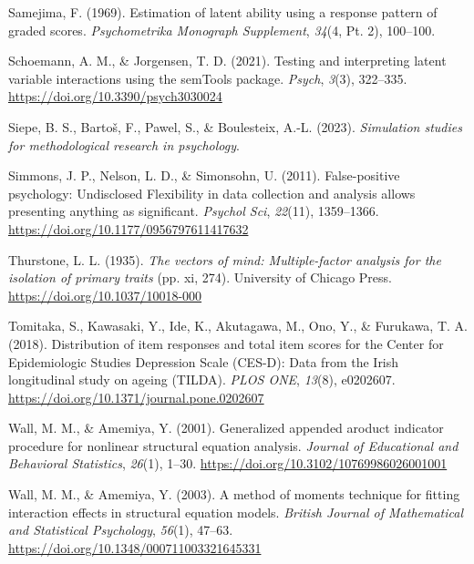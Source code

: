\documentclass[
  11pt,
  man]{apa6}
\newlength{\cslhangindent}
\newlength{\cslentryspacingunit} %
\newenvironment{CSLReferences}[2] %
 {%
  \setlength{\parindent}{0pt}
  \ifodd #1
  \let\oldpar\par
  \def\par{\hangindent=\cslhangindent\oldpar}
  \fi
  \setlength{\parskip}{#2\cslentryspacingunit}
 }%
 {}
\begin{document}
\begin{CSLReferences}{1}{0}
\leavevmode{}%
Samejima, F. (1969). Estimation of latent ability using a response pattern of graded scores. \emph{Psychometrika Monograph Supplement}, \emph{34}(4, Pt. 2), 100--100.

\leavevmode{}%
Schoemann, A. M., \& Jorgensen, T. D. (2021). Testing and interpreting latent variable interactions using the {semTools} package. \emph{Psych}, \emph{3}(3), 322--335. \url{https://doi.org/10.3390/psych3030024}

\leavevmode{}%
Siepe, B. S., Bartoš, F., Pawel, S., \& Boulesteix, A.-L. (2023). \emph{Simulation {studies} for {methodological research} in {psychology}}.

\leavevmode{}%
Simmons, J. P., Nelson, L. D., \& Simonsohn, U. (2011). False-{positive psychology}: {Undisclosed Flexibility} in {data collection} and {analysis allows presenting anything} as {significant}. \emph{Psychol Sci}, \emph{22}(11), 1359--1366. \url{https://doi.org/10.1177/0956797611417632}

\leavevmode{}%
Thurstone, L. L. (1935). \emph{The vectors of mind: {Multiple-factor} analysis for the isolation of primary traits} (pp. xi, 274). University of Chicago Press. \url{https://doi.org/10.1037/10018-000}

\leavevmode{}%
Tomitaka, S., Kawasaki, Y., Ide, K., Akutagawa, M., Ono, Y., \& Furukawa, T. A. (2018). Distribution of item responses and total item scores for the {Center} for {Epidemiologic Studies Depression Scale} ({CES-D}): {Data} from the {Irish longitudinal study} on {ageing} ({TILDA}). \emph{PLOS ONE}, \emph{13}(8), e0202607. \url{https://doi.org/10.1371/journal.pone.0202607}

\leavevmode{}%
Wall, M. M., \& Amemiya, Y. (2001). Generalized appended aroduct indicator procedure for nonlinear structural equation analysis. \emph{Journal of Educational and Behavioral Statistics}, \emph{26}(1), 1--30. \url{https://doi.org/10.3102/10769986026001001}

\leavevmode{}%
Wall, M. M., \& Amemiya, Y. (2003). A method of moments technique for fitting interaction effects in structural equation models. \emph{British Journal of Mathematical and Statistical Psychology}, \emph{56}(1), 47--63. \url{https://doi.org/10.1348/000711003321645331}


\end{CSLReferences}
\end{document}

